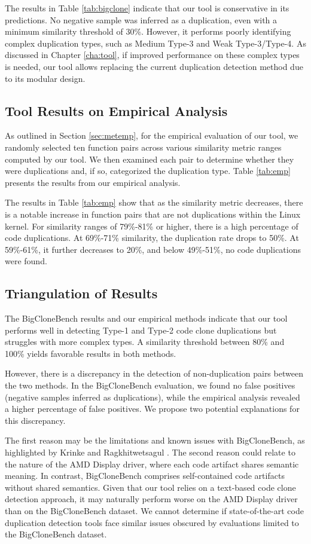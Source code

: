The results in Table \ref{tab:bigclone} indicate that our tool is conservative in its predictions. No negative sample was inferred as a duplication, even with a minimum similarity threshold of 30\%. However, it performs poorly identifying complex duplication types, such as Medium Type-3 and Weak Type-3/Type-4. As discussed in Chapter \ref{cha:tool}, if improved performance on these complex types is needed, our tool allows replacing the current duplication detection method due to its modular design.

\subsection{Tool Results on Empirical Analysis}

As outlined in Section \ref{sec:metemp}, for the empirical evaluation of our tool, we randomly selected ten function pairs across various similarity metric ranges computed by our tool. We then examined each pair to determine whether they were duplications and, if so, categorized the duplication type. Table \ref{tab:emp} presents the results from our empirical analysis.



The results in Table \ref{tab:emp} show that as the similarity metric decreases, 
there is a notable increase in function pairs that are not duplications within 
the Linux kernel. For similarity ranges of 79\%-81\% or higher, there is a high 
percentage of code duplications. At 69\%-71\% similarity, the duplication rate 
drops to 50\%. At 59\%-61\%, it further decreases to 20\%, and below 49\%-51\%, 
no code duplications were found.

\subsection{Triangulation of Results}

The BigCloneBench results and our empirical methods indicate that our tool performs well in detecting Type-1 and Type-2 code clone duplications but struggles with more complex types. A similarity threshold between 80\% and 100\% yields favorable results in both methods.

However, there is a discrepancy in the detection of non-duplication pairs between the two methods. In the BigCloneBench evaluation, we found no false positives (negative samples inferred as duplications), while the empirical analysis revealed a higher percentage of false positives. We propose two potential explanations for this discrepancy.

The first reason may be the limitations and known issues with BigCloneBench, as highlighted by Krinke and Ragkhitwetsagul \citep{bigfail}. The second reason could relate to the nature of the AMD Display driver, where each code artifact shares semantic meaning. In contrast, BigCloneBench comprises self-contained code artifacts without shared semantics. Given that our tool relies on a text-based code clone detection approach, it may naturally perform worse on the AMD Display driver than on the BigCloneBench dataset. We cannot determine if state-of-the-art code duplication detection tools face similar issues obscured by evaluations limited to the BigCloneBench dataset.
